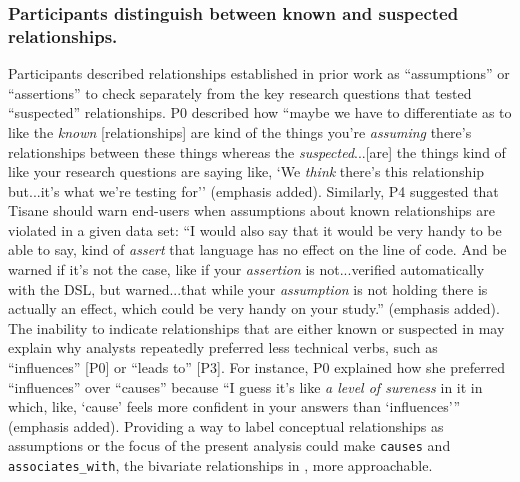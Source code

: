 \subsubsection{Participants distinguish between known and suspected relationships.}
Participants described relationships established in prior work as
``assumptions'' or ``assertions'' to check separately from the key research
questions that tested ``suspected'' relationships. P0 described how ``maybe we
have to differentiate as to like the \textit{known} [relationships] are kind of
the things you're \textit{assuming} there's relationships between these things
whereas the \textit{suspected}...[are] the things kind of like your research
questions are saying like, `We \textit{think} there's this relationship
but...it's what we're testing for'' (emphasis added). Similarly, P4 suggested
that Tisane should warn end-users when assumptions about known relationships are
violated in a given data set: ``I would also say that it would be very handy to
be able to say, kind of \textit{assert} that language has no effect on the line
of code. And be warned if it's not the case, like if your \textit{assertion} is
not...verified automatically with the DSL, but warned...that while your
\textit{assumption} is not holding there is actually an effect, which could be
very handy on your study.'' (emphasis added). The inability to indicate
relationships that are either known or suspected in \tisane may explain why
analysts repeatedly preferred less technical verbs, such as ``influences'' [P0]
or ``leads to'' [P3]. For instance, P0 explained how she preferred
``influences'' over ``causes'' because ``I guess it's like \textit{a level of
sureness} in it in which, like, `cause' feels more confident in your answers
than `influences''' (emphasis added). Providing a way to label conceptual
relationships as assumptions or the focus of the present analysis could make
\texttt{causes} and \texttt{associates\_with}, the bivariate relationships in
\tisane, more approachable. 


